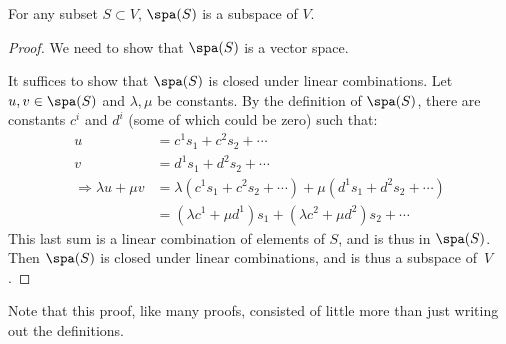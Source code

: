 
\begin{lemma}
For any subset $S\subset V$, $\spa(S)$ is a subspace of $V$.
\end{lemma}

\begin{proof}
We need to show that $\spa(S)$ is a vector space.

It suffices to show that $\spa(S)$ is closed under linear combinations.  Let $u,v\in \spa(S)$ and $\lambda, \mu$ be constants.  By the definition of $\spa(S)$, there are constants $c^i$ and $d^i$ (some of which could be zero) such that:
\begin{align*}
u & = c^1s_1+c^2s_2+\cdots \\
v & = d^1s_1+d^2s_2+\cdots \\
\Rightarrow \lambda u + \mu v & = \lambda (c^1s_1+c^2s_2+\cdots ) + \mu (d^1s_1+d^2s_2+\cdots ) \\
& = (\lambda c^1+\mu d^1)s_1 + (\lambda c^2+\mu d^2)s_2 + \cdots
\end{align*}
This last sum is a linear combination of elements of $S$, and is thus in $\spa(S)$.  Then $\spa(S)$ is closed under linear combinations, and is thus a subspace of~$V$.
\end{proof}

Note that this proof, like many proofs, consisted of little more than just writing out the definitions.




